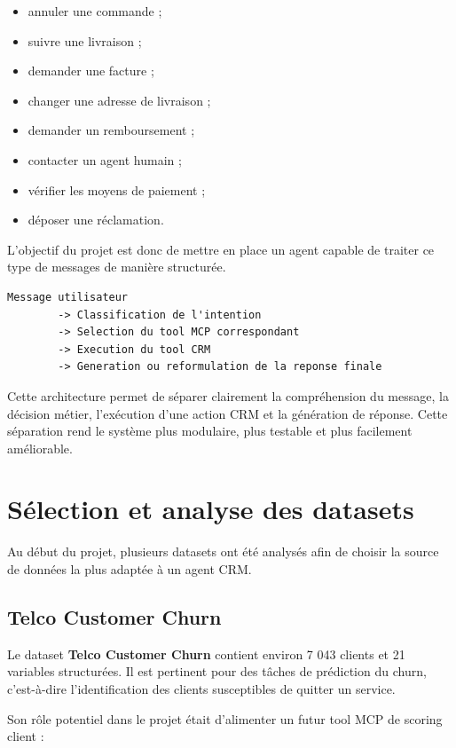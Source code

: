 \documentclass[12pt,a4paper]{report}
\begin{document}
\begin{itemize}
    \item annuler une commande ;
    \item suivre une livraison ;
    \item demander une facture ;
    \item changer une adresse de livraison ;
    \item demander un remboursement ;
    \item contacter un agent humain ;
    \item vérifier les moyens de paiement ;
    \item déposer une réclamation.
\end{itemize}

L'objectif du projet est donc de mettre en place un agent capable de traiter ce type de messages de manière structurée.

\begin{lstlisting}
Message utilisateur
        -> Classification de l'intention
        -> Selection du tool MCP correspondant
        -> Execution du tool CRM
        -> Generation ou reformulation de la reponse finale
\end{lstlisting}

Cette architecture permet de séparer clairement la compréhension du message, la décision métier, l'exécution d'une action CRM et la génération de réponse. Cette séparation rend le système plus modulaire, plus testable et plus facilement améliorable.

\section{Sélection et analyse des datasets}

Au début du projet, plusieurs datasets ont été analysés afin de choisir la source de données la plus adaptée à un agent CRM.

\subsection{Telco Customer Churn}

Le dataset \textbf{Telco Customer Churn} contient environ 7 043 clients et 21 variables structurées. Il est pertinent pour des tâches de prédiction du churn, c'est-à-dire l'identification des clients susceptibles de quitter un service.

Son rôle potentiel dans le projet était d'alimenter un futur tool MCP de scoring client :
\end{document}
